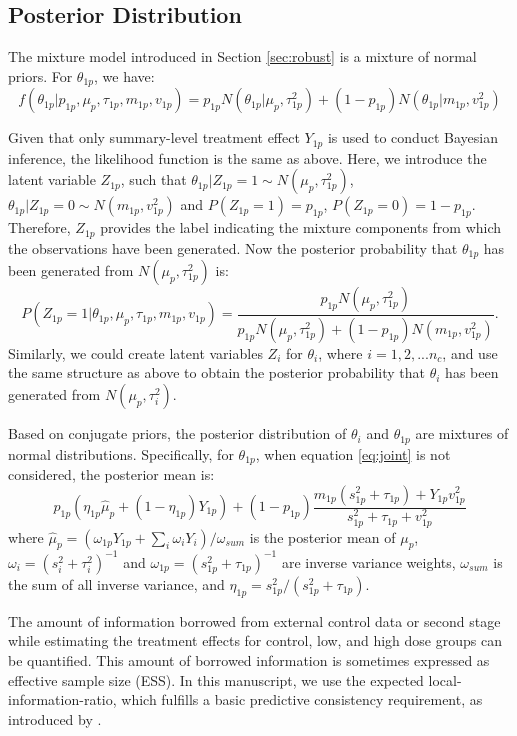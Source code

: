 \subsection{Posterior Distribution}
The mixture model introduced in Section \ref{sec:robust} is a mixture of normal priors. For $\theta_{1p}$, we have:
\begin{equation*}
    f(\theta_{1p}|p_{1p}, \mu_{p},\tau_{1p}, m_{1p}, v_{1p}) = p_{1p}N(\theta_{1p}|\mu_p,\tau_{1p}^2)+(1-p_{1p})N(\theta_{1p}|m_{1p},v_{1p}^2) 
\end{equation*}

Given that only summary-level treatment effect $Y_{1p}$ is used to conduct Bayesian inference, the likelihood function is the same as above. Here, we introduce the latent variable $Z_{1p}$, such that $\theta_{1p}|Z_{1p} = 1 \sim N(\mu_{p},\tau_{1p}^2)$, $\theta_{1p}|Z_{1p} = 0 \sim N(m_{1p}, v_{1p}^2)$
and $P(Z_{1p} = 1) = p_{1p}$, $P(Z_{1p} = 0) = 1-p_{1p}$.
Therefore, $Z_{1p}$ provides the label indicating the mixture components from which the observations have been generated. Now the posterior probability that $\theta_{1p}$ has been generated from $N(\mu_p, \tau_{1p}^2)$ is:
\begin{equation*}
    P(Z_{1p} = 1|\theta_{1p}, \mu_{p},\tau_{1p}, m_{1p}, v_{1p})=\frac{p_{1p}N(\mu_p, \tau_{1p}^2)}{p_{1p}N(\mu_p, \tau_{1p}^2)+(1-p_{1p})N(m_{1p}, v_{1p}^2)}.
\end{equation*}
Similarly, we could create latent variables $Z_i$ for $\theta_i$, where $i = 1, 2, ... n_c$, and use the same structure as above to obtain the posterior probability that $\theta_i$ has been generated from $N(\mu_p, \tau_i^2)$. 

Based on conjugate priors, the posterior distribution of $\theta_i$ and $\theta_{1p}$ are mixtures of normal distributions. Specifically, for $\theta_{1p}$, when equation \ref{eq:joint} is not considered, the posterior mean is:
\begin{equation*}
    p_{1p}(\eta_{1p}\hat{\mu}_p+(1-\eta_{1p})Y_{1p})+(1-p_{1p})\frac{m_{1p}(s_{1p}^2+\tau_{1p})+Y_{1p}v_{1p}^2}{s_{1p}^2+\tau_{1p}+v_{1p}^2}
\end{equation*}
where $\hat{\mu}_p = (\omega_{1p}Y_{1p} + \sum_{i}{\omega_{i}Y_{i}})/\omega_{sum}$ is the posterior mean of $\mu_p$, $\omega_i = (s_i^2+\tau_i^2)^{-1}$ and $\omega_{1p} = (s_{1p}^2+\tau_{1p})^{-1}$ are inverse variance weights, $\omega_{sum}$ is the sum of all inverse variance, and $\eta_{1p}=s_{1p}^2/(s_{1p}^2+\tau_{1p})$. 

The amount of information borrowed from external control data or second stage while estimating the treatment effects for control, low, and high dose groups can be quantified. This amount of borrowed information is sometimes expressed as effective sample size (ESS). In this manuscript, we use the expected local-information-ratio, which fulfills a basic predictive consistency requirement, as introduced by \cite{neuenschwander2020predictively}. 

